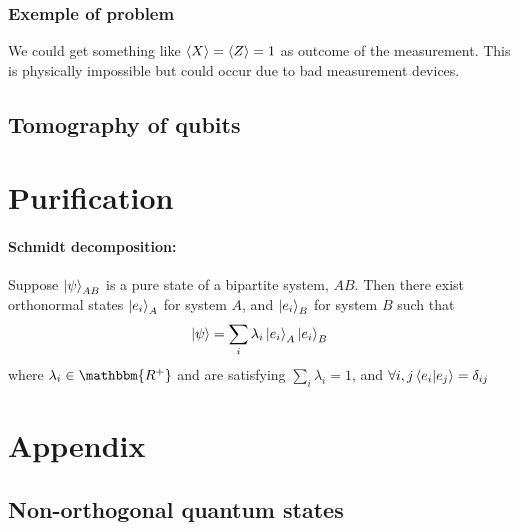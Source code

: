 \documentclass{article}
\begin{document}
\subsubsection*{Exemple of problem}
We could get something like $\braket{X}=\braket{Z}=1$ as outcome of the measurement.
This is physically impossible but could occur due to bad measurement devices.

\subsection{Tomography of qubits}

\section{Purification}
\paragraph{Schmidt decomposition: }
Suppose $\ket{\psi}_{AB}$ is a pure state of a bipartite system, $AB$. Then there exist
orthonormal states $\ket{e_i}_A$ for system $A$, and $\ket{e_i}_B$ for system $B$ such
that
\begin{equation}
    \ket{\psi} = \sum_i\lambda_i \ket{e_i}_A \ket{e_i}_B
\end{equation}
where $\lambda_i \in \mathbbm{R^+}$ and are satisfying $\sum_i\lambda_i=1$, and
$\forall i,j \braket{e_i|e_j}=\delta_{ij}$


\newpage
\section{Appendix}
\subsection{Non-orthogonal quantum states}
\end{document}
